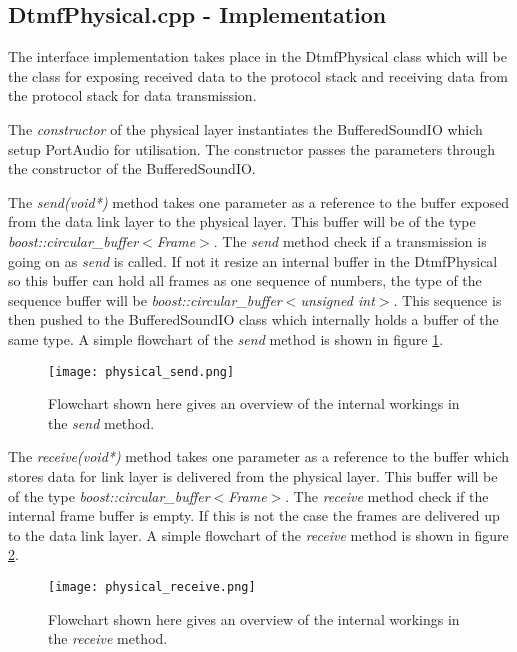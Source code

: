 	\subsection{DtmfPhysical.cpp - Implementation}
	The interface implementation takes place in the DtmfPhysical class which will be the class for exposing received data to the protocol stack
	and receiving data from the protocol stack for data transmission.
	
	The \textit{constructor} of the physical layer instantiates the BufferedSoundIO which setup PortAudio for utilisation. The constructor passes the
	parameters through the constructor of the BufferedSoundIO.
	
	The \textit{send(void*)} method takes one parameter as a reference to the buffer exposed from the data link layer to the physical layer. This buffer
	will be of the type \textit{boost::circular\_buffer$<$Frame$>$}. The \textit{send} method check if a transmission is going on as \textit{send} is called.
	If not it resize an internal buffer in the DtmfPhysical so this buffer can hold all frames as one sequence of numbers, the type of 
	the sequence buffer will be \textit{boost::circular\_buffer$<$unsigned int$>$}. This sequence is then pushed to the BufferedSoundIO class which
	internally holds a buffer of the same type. A simple flowchart of the \textit{send} method is shown in figure \ref{fig:physical_send}.
	
	\begin{figure}[htb]
		\begin{center}
		\texttt{[image: physical\_send.png]}%
		\caption{Flowchart shown here gives an overview of the internal workings in the \textit{send} method.}
		\label{fig:physical_send}
		\end{center}
	\end{figure}
	
	The \textit{receive(void*)} method takes one parameter as a reference to the buffer which stores data for link layer is delivered from the physical layer.
	This buffer	will be of the type \textit{boost::circular\_buffer$<$Frame$>$}. The \textit{receive} method check if the internal frame buffer is empty.
	If this is not the case the frames are delivered up to the data link layer. A simple flowchart of the \textit{receive} method is shown in figure \ref{fig:physical_receive}.
	
	\begin{figure}[htb]
		\begin{center}
		\texttt{[image: physical\_receive.png]}%
		\caption{Flowchart shown here gives an overview of the internal workings in the \textit{receive} method.}
		\label{fig:physical_receive}
		\end{center}
	\end{figure}
	
